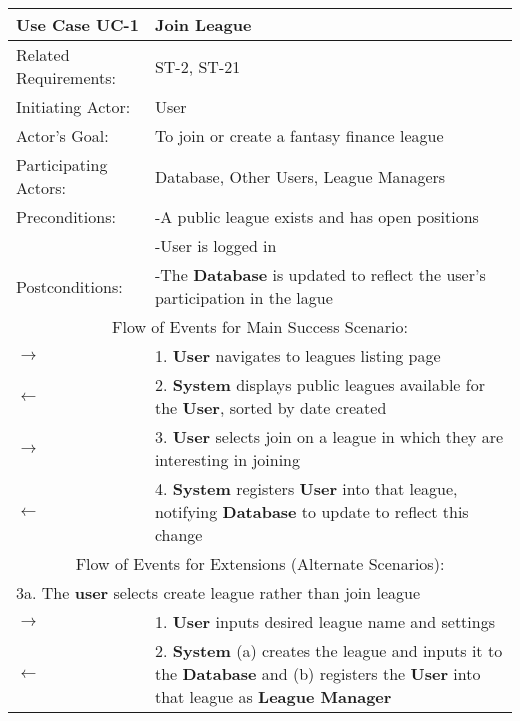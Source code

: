 \begin{centering}
\renewcommand\arraystretch{1.3} %
\begin{longtable}{|p{1.2in} p{5in}|}
\hline
\bfseries{\color{color1}Use Case UC-1} & \bfseries{\color{color1}Join League} \\
\hline
Related Requirements: & ST-2, ST-21 \\ 
Initiating Actor:     & User \\
Actor's Goal:         & To join or create a fantasy finance league \\
Participating Actors:  & Database, Other Users, League Managers\\
Preconditions:        & -A public league exists and has open positions \\
 & -User is logged in \\
Postconditions:       & -The \textbf{Database} is updated to reflect the user's participation in the lague \\
\hline
\multicolumn{2}{|c|}{\color{color1}Flow of Events for Main Success Scenario:}\\
\hline
$\rightarrow$ & 1. \textbf{User} navigates to leagues listing page \\
$\leftarrow$ & 2. \textbf{System} displays public leagues available for the \textbf{User}, sorted by date created \\
$\rightarrow$ & 3. \textbf{User} selects join on a league in which they are interesting in joining \\
$\leftarrow$ & 4. \textbf{System} registers \textbf{User} into that league, notifying \textbf{Database} to update to reflect this change \\
\hline
\multicolumn{2}{|c|}{\color{color1}Flow of Events for Extensions (Alternate Scenarios):} \\
\hline
\multicolumn{2}{|p{6.2in}|}{3a. The \textbf{user} selects create league rather than join league} \\
\hline
$\rightarrow$ & 1.  \textbf{User} inputs desired league name and settings \\
$\leftarrow$ & 2. \textbf{System} (a) creates the league and inputs it to the \textbf{Database} and (b) registers the \textbf{User} into that league as \textbf{League Manager} \\
\hline 
\end{longtable}
\end{centering}

